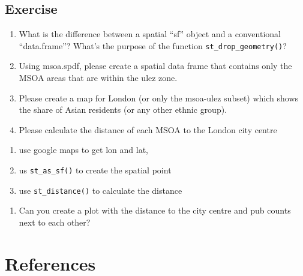 \documentclass[
  letterpaper,
  DIV=11,
  numbers=noendperiod]{scrreprt}
\providecommand{\tightlist}{%
  \setlength{\itemsep}{0pt}\setlength{\parskip}{0pt}}\usepackage{longtable,booktabs,array}
\begin{document}
\hypertarget{exercise}{%
\section{Exercise}\label{exercise}}

\begin{enumerate}
\def\labelenumi{\arabic{enumi})}
\item
  What is the difference between a spatial ``sf'' object and a
  conventional ``data.frame''? What's the purpose of the function
  \texttt{st\_drop\_geometry()}?
\item
  Using msoa.spdf, please create a spatial data frame that contains only
  the MSOA areas that are within the ulez zone.
\item
  Please create a map for London (or only the msoa-ulez subset) which
  shows the share of Asian residents (or any other ethnic group).
\item
  Please calculate the distance of each MSOA to the London city centre
\end{enumerate}

\begin{enumerate}
\def\labelenumi{\alph{enumi})}
\tightlist
\item
  use google maps to get lon and lat,
\item
  us \texttt{st\_as\_sf()} to create the spatial point
\item
  use \texttt{st\_distance()} to calculate the distance
\end{enumerate}

\begin{enumerate}
\def\labelenumi{\arabic{enumi})}
\setcounter{enumi}{4}
\tightlist
\item
  Can you create a plot with the distance to the city centre and pub
  counts next to each other?
\end{enumerate}


\hypertarget{references}{%
\chapter*{References}\label{references}}

\end{document}
